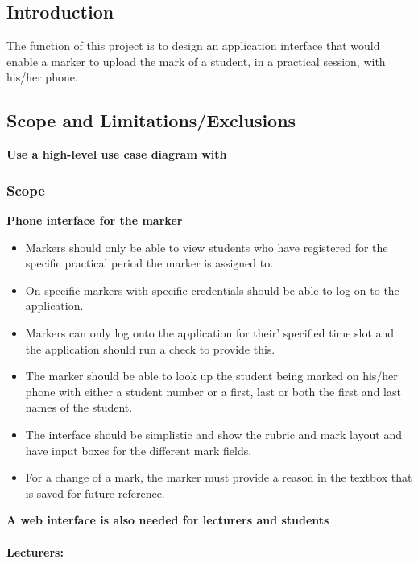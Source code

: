 \documentclass[11pt,a4paper]{article}
\begin{document}
\subsection{Introduction}
The function of this project is to design an application interface that would enable a marker to upload the mark of a student, in a practical session, with his/her phone.
\subsection{Scope and Limitations/Exclusions}
\textbf {Use a high-level use case diagram with}\\
\subsubsection{Scope}
\textbf {Phone interface for the marker}

\begin{itemize}
\item Markers should only be able to view students who have registered for the specific practical period the marker is assigned to.
\item On specific markers with specific credentials should be able to log on to the application.
\item Markers can only log onto the application for their’ specified time slot and the application should run a check to provide this.
\item The marker should be able to look up the student being marked on his/her phone with either a student number or a first, last or both the first and last names of the student.
\item The interface should be simplistic and show the rubric and mark layout and have input boxes for the different mark fields.
\item For a change of a mark, the marker must provide a reason in the textbox that is saved for future reference.
\end{itemize}
\textbf{A web interface is also needed for lecturers and students}\\\\
\textbf{Lecturers:}
\end{document}
